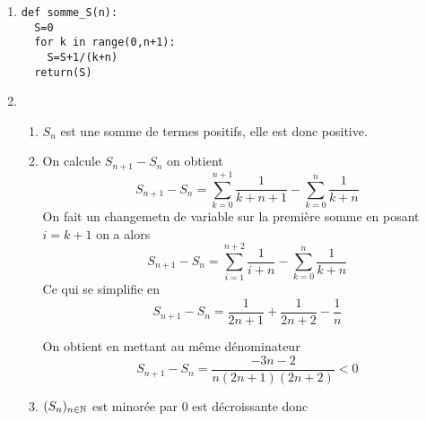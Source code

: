 \documentclass[a4paper, 11pt]{article}
\begin{document}
\begin{correction}
\begin{enumerate}
\item 
\begin{lstlisting}
def somme_S(n):
  S=0
  for k in range(0,n+1):
    S=S+1/(k+n)
  return(S)
\end{lstlisting}

\item 
\begin{enumerate}
\item


$S_n$ est  une somme de termes positifs, elle est donc positive. 

\item On calcule $S_{n+1}-S_n$ on obtient 
$$S_{n+1}-S_n = \sum_{k=0}^{n+1} \frac{1}{k+n+1}- \sum_{k=0}^n \frac{1}{k+n}$$
On fait un changemetn de variable sur la première somme en posant $i=k+1$ on a alors 
$$S_{n+1} -S_n  =\sum_{i=1}^{n+2} \frac{1}{i+n}- \sum_{k=0}^n \frac{1}{k+n}$$
Ce qui se simplifie en 
$$S_{n+1} -S_n  =\frac{1}{2n+1} +\frac{1}{2n+2} - \frac{1}{n}$$

On obtient en mettant au même dénominateur 
$$S_{n+1}-S_n  =\frac{-3n-2}{n(2n+1)(2n+2)}<0$$










\item 
$(S_n)_{n\in \mathbb{N}}$ est minorée par $0$ est  décroissante donc



\end{enumerate}
\end{enumerate}
\end{correction}
\end{document}
